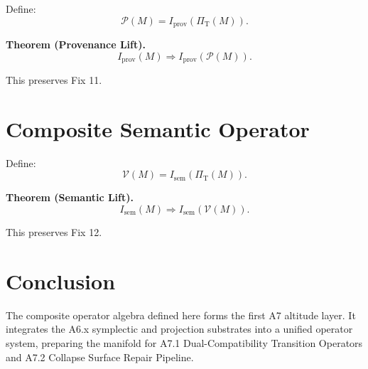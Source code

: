 \documentclass[11pt]{article}
\begin{document}
Define:
\[
\mathcal{P}(M) = I_{\mathrm{prov}}(\Pi_{\mathrm{T}}(M)).
\]

\textbf{Theorem (Provenance Lift).}
\[
I_{\mathrm{prov}}(M) \Rightarrow I_{\mathrm{prov}}(\mathcal{P}(M)).
\]

This preserves Fix 11.

\section{Composite Semantic Operator}

Define:
\[
\mathcal{V}(M) = I_{\mathrm{sem}}(\Pi_{\mathrm{T}}(M)).
\]

\textbf{Theorem (Semantic Lift).}
\[
I_{\mathrm{sem}}(M) \Rightarrow I_{\mathrm{sem}}(\mathcal{V}(M)).
\]

This preserves Fix 12.

\section{Conclusion}

The composite operator algebra defined here forms the first A7 altitude layer.
It integrates the A6.x symplectic and projection substrates into a unified
operator system, preparing the manifold for A7.1 Dual-Compatibility Transition
Operators and A7.2 Collapse Surface Repair Pipeline.
\end{document}
